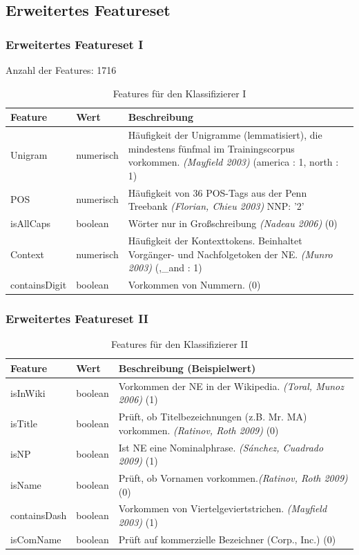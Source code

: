 \documentclass{beamer}
\begin{document}
	\subsection{Erweitertes Featureset}
	\begin{frame}
		\frametitle{Erweitertes Featureset I}
		Anzahl der Features: 1716
 			\begin{table}
 				\small
 				\caption{Features für den Klassifizierer I}
 				\begin{tabularx}{\textwidth}{llX}
 					\toprule
 					Feature & Wert & Beschreibung\\
 					\midrule
 					Unigram & numerisch & Häufigkeit der Unigramme (lemmatisiert), die mindestens fünfmal im Trainingscorpus vorkommen. \textit{(Mayfield 2003)} \color{red}(america : 1, north : 1)\\
 					POS & numerisch  & Häufigkeit von 36 POS-Tags aus der Penn Treebank \textit{(Florian, Chieu 2003)} \color{red}NNP: '2'\\
 					isAllCaps & boolean & Wörter nur in Großschreibung \textit{(Nadeau 2006)} \color{red} (0)\\
 					Context & numerisch & Häufigkeit der Kontexttokens. Beinhaltet Vorgänger- und Nachfolgetoken der NE. \textit{(Munro 2003)}  \color{red} (,\_and : 1)\\
 					containsDigit & boolean & Vorkommen von Nummern. \color{red} (0)\textit{}\\
 					\bottomrule
 				\end{tabularx}
 				\label{tab:allf1}
 			\end{table}
 	\end{frame}
 		\begin{frame}
 			\frametitle{Erweitertes Featureset II}
 					\begin{table}
 						\small
 						\caption{Features für den  Klassifizierer II}
 						\begin{tabularx}{\textwidth}{llX}
 							\toprule
 							Feature & Wert & Beschreibung (Beispielwert)\\
 							\midrule
 							isInWiki & boolean & Vorkommen der NE in der Wikipedia. \textit{(Toral, Munoz 2006)} \color{red} (1)\\
 							isTitle & boolean & Prüft, ob Titelbezeichnungen (z.B. Mr. MA) vorkommen. \textit{(Ratinov, Roth 2009)} (0)\\
 							isNP & boolean & Ist NE eine Nominalphrase. \textit{(Sánchez, Cuadrado 2009)} \color{red} (1)\\
 							isName & boolean & Prüft, ob Vornamen vorkommen.\textit{(Ratinov, Roth 2009)} \color{red}(0)\\
 							containsDash & boolean & Vorkommen von Viertelgeviertstrichen. \textit{(Mayfield 2003)} \color{red}(1) \\
 							isComName & boolean & Prüft auf kommerzielle Bezeichner (Corp., Inc.) \color{red} (0)\\
 							\bottomrule
 						\end{tabularx}
 						\label{tab:allf2}
 					\end{table}
 		\end{frame}
\end{document}
